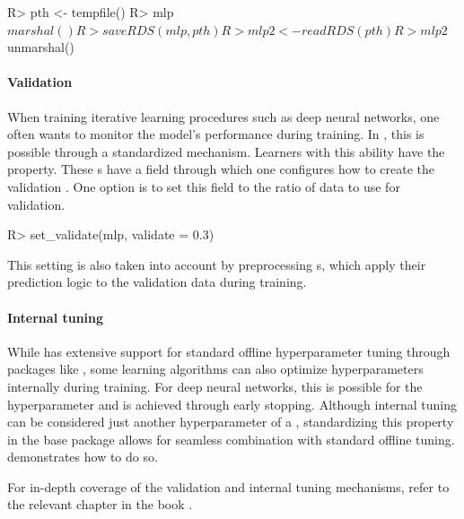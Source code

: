 \documentclass[article,shortnames]{jss}
\theoremstyle{definition}
\renewenvironment{CodeChunk}{\par\addvspace{0.6\baselineskip}\noindent\begin{minipage}{\linewidth}}{\end{minipage}\par\vspace{0.6\baselineskip}}
\begin{document}
\begin{CodeChunk}
\begin{CodeInput}
R> pth <- tempfile()
R> mlp$marshal()
R> saveRDS(mlp, pth)
R> mlp2 <- readRDS(pth)
R> mlp2$unmarshal()
\end{CodeInput}
\end{CodeChunk}

\paragraph{Validation}

When training iterative learning procedures such as deep neural networks, one often wants to monitor the model's performance during training.
In \mlrt{}, this is possible through a standardized mechanism.
Learners with this ability have the  property.
These s have a  field through which one configures how to create the validation .
One option is to set this field to the ratio of data to use for validation.

\begin{CodeChunk}
\begin{CodeInput}
R> set_validate(mlp, validate = 0.3)
\end{CodeInput}
\end{CodeChunk}

This setting is also taken into account by preprocessing s, which apply their prediction logic to the validation data during training.

\paragraph{Internal tuning}

While \mlrt{} has extensive support for standard offline hyperparameter tuning through packages like  \citep{ref-mlr3tuning2024}, some learning algorithms can also optimize hyperparameters internally during training.
For deep neural networks, this is possible for the  hyperparameter and is achieved through early stopping.
Although internal tuning can be considered just another hyperparameter of a , standardizing this property in the \mlrt{} base package allows for seamless combination with standard offline tuning.
 demonstrates how to do so.

For in-depth coverage of the validation and internal tuning mechanisms, refer to the relevant chapter in the  book \citep{ref-mlr3book-valid}.
\end{document}
